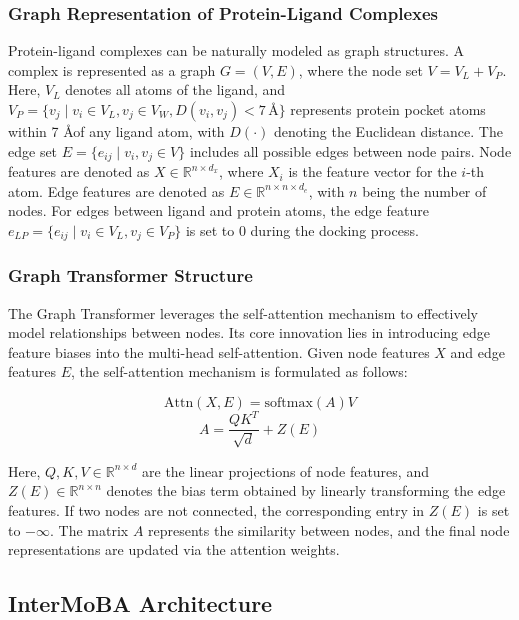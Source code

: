 \documentclass[11pt,a4paper]{article}
\begin{document}
\subsubsection{Graph Representation of Protein-Ligand Complexes}
Protein-ligand complexes can be naturally modeled as graph structures. A
complex is represented as a graph $G = (V,E)$, where the
node set $V = V_{L} + V_{P}$. Here, $V_{L}$ denotes all atoms
of the ligand,
and $V_{P} = \{ v_{j} \mid v_{i} \in V_{L}, v_{j} \in V_{W}, D(v_{i},v_{j}) < 7\,\text{\AA} \}$ represents protein
pocket atoms within 7 \AA of any ligand atom, with $D( \cdot )$
denoting the Euclidean distance. The edge set $E = \{ e_{ij} \mid v_{i}, v_{j} \in V\}$ includes all
possible edges between node pairs. Node features
are denoted as $X \in \mathbb{R}^{n \times d_{x}}$, where $X_{i}$ is the
feature vector for the $i$-th atom. Edge features are denoted
as $E \in \mathbb{R}^{n \times n \times d_{e}}$, with $n$ being
the number of nodes. For edges between ligand and protein atoms,
the edge
feature $e_{LP} = \{ e_{ij} \mid v_{i} \in V_{L}, v_{j} \in V_{P}\}$ is
set to 0 during the docking process.

\subsubsection{Graph Transformer Structure}
The Graph Transformer\cite{yun2019graph}\cite{yuan2022alphafold2} leverages the self-attention mechanism to
effectively model relationships between nodes. Its core innovation lies
in introducing edge feature biases into the multi-head self-attention.
Given node features $X$ and edge features $E$, the
self-attention mechanism is formulated as follows:

\begin{equation}
\text{Attn}(X,E) = \text{softmax}(A)V
\end{equation}
\begin{equation}
A = \frac{QK^{T}}{\sqrt{d}} + Z(E)
\end{equation}

Here, $Q,K,V \in \mathbb{R}^{n \times d}$ are the linear projections of
node features, and $Z(E) \in \mathbb{R}^{n \times n}$ denotes the bias
term obtained by linearly transforming the edge features. If two nodes
are not connected, the corresponding entry in $Z(E)$ is set
to $-\infty$. The matrix $A$ represents the similarity between nodes,
and the final node representations are updated via the attention
weights.

\subsection{InterMoBA Architecture}
\end{document}
